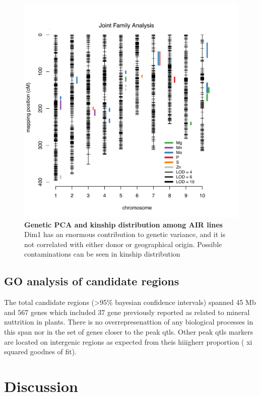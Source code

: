 \begin{figure}[!ht]
\includegraphics[width=0.8\paperwidth]{Chapter-3/figs/fig3-4.pdf}
\caption{\textbf{Genetic PCA and kinship distribution among AIR lines}
Dim1 has an enormous contribution to genetic variance, and it is not correlated with either donor or geographical origin. Possible contaminations can be seen in kinship distribution}
\label{Fig3.1}
\end{figure}
\clearpage


\subsection{GO analysis of candidate regions}
The total candidate regions (>95\% bayesian confidence intervals) spanned 45 Mb and 567 genes which included 37 gene previously reported as related to mineral nuttrition in plants. There is no overrepresenattion of any biological processes in this span nor in the set of genes closer to the peak qtls. Other peak qtls  markers are located on intergenic regions as expected from theis hiiigherr proportion ( xi squared goodnes of fit). 

\section{Discussion}

\printbibliography[heading=subbibintoc, title=References]

